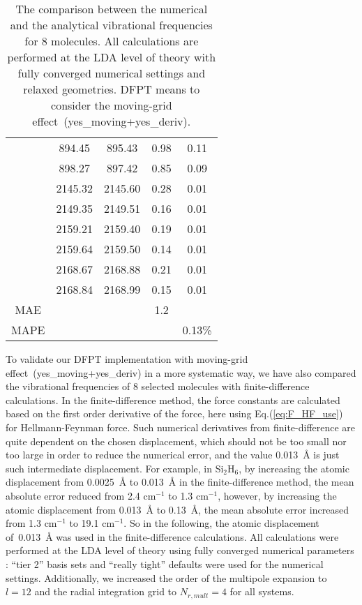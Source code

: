 \documentclass[journal=jpca,manuscript=article]{achemso}
\begin{document}
\begin{table}
{\begin{tabular}{c| c c c c }
& 894.45 & 895.43 & 0.98 & 0.11 \\
& 898.27 & 897.42 & 0.85 & 0.09 \\
& 2145.32 & 2145.60 & 0.28 & 0.01 \\
& 2149.35 & 2149.51 & 0.16 & 0.01 \\
& 2159.21 & 2159.40 & 0.19 & 0.01 \\
& 2159.64 & 2159.50 & 0.14 & 0.01 \\
& 2168.67 & 2168.88 & 0.21 & 0.01 \\
& 2168.84 & 2168.99 & 0.15 & 0.01 \\ 
 \hline
MAE &        &          & 1.2 &    \\
MAPE&        &          &       & 0.13\%\\
\hline \hline
\end{tabular}
}
\caption{The comparison between the numerical and the analytical vibrational frequencies for 8 molecules. All calculations are performed at the LDA level of theory with fully converged numerical settings and relaxed geometries. DFPT means to consider the moving-grid effect~(yes\_moving+yes\_deriv).}
\label{tab:molecules test}
\end{table} 

To validate our DFPT implementation with moving-grid effect~(yes\_moving+yes\_deriv) in a more systematic way, we have also compared the vibrational frequencies of 8 selected molecules with finite-difference calculations.
In the finite-difference method, the force constants are calculated based on the first order derivative of the force, here using Eq.(\ref{eq:F_HF_use}) for Hellmann-Feynman force. 
Such numerical derivatives from finite-difference are quite dependent on the chosen displacement, which should not be too small nor too large in order to reduce the numerical error, and the value 0.013~{\AA} is just such intermediate displacement.
For example, in Si$_2$H$_6$, by increasing the atomic displacement from 0.0025~{\AA} to 0.013~{\AA} in the finite-difference method, the mean absolute error reduced from 2.4 cm$^{-1}$ to 1.3 cm$^{-1}$, however, by increasing the atomic displacement from 0.013~{\AA}  to 0.13~{\AA}, the mean absolute error increased from 1.3 cm$^{-1}$ to 19.1 cm$^{-1}$. 
So in the following, the atomic displacement of~0.013~{\AA} was used in the finite-difference calculations.
All calculations were performed at the LDA level of theory using fully converged numerical parameters : ``tier 2'' basis sets and ``really tight'' defaults were used for the numerical settings. Additionally, we increased the order of the multipole expansion to~$l=12$ and the radial integration grid to $N_{r,mult}=4$ for all systems. 
\end{document}

